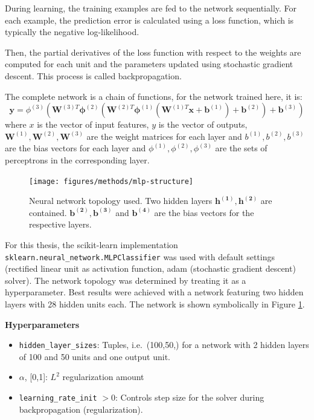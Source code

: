 \documentclass[
  11pt,
  a4paper,
  DIV=12,captions=tableheading,oneside,titlepage]{scrbook}
\providecommand{\tightlist}{%
  \setlength{\itemsep}{0pt}\setlength{\parskip}{0pt}}
\begin{document}
During learning, the training examples are fed to the network sequentially. For each example, the prediction error is calculated using a loss function, which is typically the negative log-likelihood.

Then, the partial derivatives of the loss function with respect to the weights are computed for each unit and the parameters updated using stochastic gradient descent. This process is called backpropagation.

The complete network is a chain of functions, for the network trained here, it is: \begin{equation}
\mathbf{y} = \phi^{(3)}(\mathbf{W}^{(3)T} \mathbf{\phi}^{(2)}(\mathbf{W}^{(2)T} \mathbf{\phi}^{(1)}(\mathbf{W}^{(1)T} \mathbf{x} + \mathbf{b}^{(1)}) + \mathbf{b}^{(2)}) + \mathbf{b}^{(3)})
\end{equation} where \(x\) is the vector of input features, \(y\) is the vector of outputs, \(\mathbf{W}^{(1)}, \mathbf{W}^{(2)}, \mathbf{W}^{(3)}\) are the weight matrices for each layer and \(b^{(1)}, b^{(2)}, b^{(3)}\) are the bias vectors for each layer and \(\phi^{(1)}, \phi^{(2)}, \phi^{(3)}\) are the sets of perceptrons in the corresponding layer.



\begin{figure}

{\centering \texttt{[image: figures/methods/mlp-structure]} 

}

\caption{Neural network topology used. Two hidden layers \(\mathbf{h^{(1)}, h^{(2)}}\) are contained. \(\mathbf{b^{(2)}, b^{(3)}}\) and \(\mathbf{b^{(4)}}\) are the bias vectors for the respective layers.}\label{fig:mlp-graph}
\end{figure}

For this thesis, the scikit-learn implementation \texttt{sklearn.neural\_network.MLPClassifier} was used with default settings (rectified linear unit as activation function, adam (stochastic gradient descent) solver). The network topology was determined by treating it as a hyperparameter. Best results were achieved with a network featuring two hidden layers with 28 hidden units each. The network is shown symbolically in Figure \ref{fig:mlp-graph}.

\textbf{Hyperparameters}

\begin{itemize}
\tightlist
\item
  \texttt{hidden\_layer\_sizes}: Tuples, i.e.~(100,50,) for a network with 2 hidden layers of 100 and 50 units and one output unit.
\item
  \(\alpha\), {[}0,1{]}: \(L^2\) regularization amount
\item
  \texttt{learning\_rate\_init} \(>0\): Controls step size for the solver during backpropagation (regularization).
\end{itemize}
\end{document}
